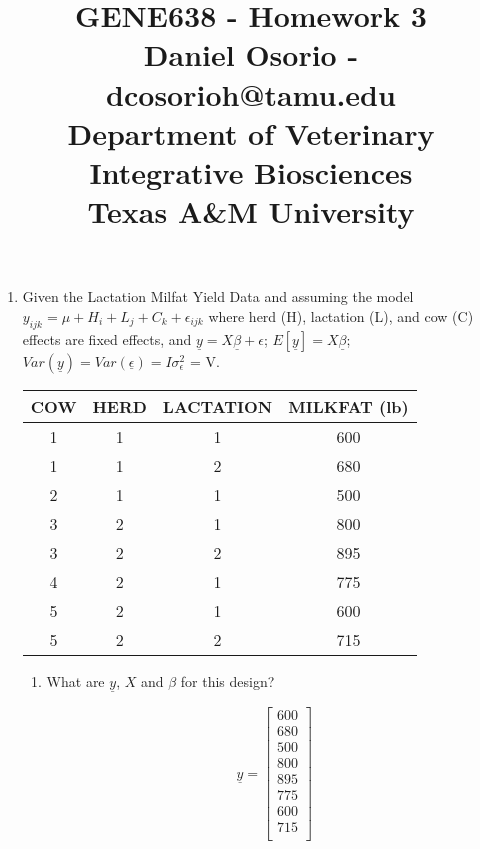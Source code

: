 \documentclass[12pt,a4paper]{paper}
\begin{document}
\title{GENE638 - Homework 3\\\small{Daniel Osorio - dcosorioh@tamu.edu\\Department of Veterinary Integrative Biosciences\\Texas A\&M University}}
\maketitle

\begin{enumerate}
\item Given the Lactation Milfat Yield Data and assuming the model $y_{ijk} = \mu + H_{i} + L_{j}+C_{k} + \epsilon_{ijk}$ where herd (H), lactation (L), and cow (C) effects are fixed effects, and $\underline{y} = X\underline{\beta} + \epsilon$; $E\left[\underline{y}\right] = X\underline{\beta}$; $Var(\underline{y}) = Var(\underline{\epsilon}) = I\sigma^{2}_{\epsilon}$ = V.
\begin{center}
\begin{tabular}{|c|c|c|c|}
\hline
COW & HERD & LACTATION & MILKFAT (lb) \\
\hline
\hline
1 & 1 & 1 & 600 \\
\hline
1 & 1 & 2 & 680 \\
\hline
2 & 1 & 1 & 500 \\
\hline
3 & 2 & 1 & 800 \\
\hline
3 & 2 & 2 & 895 \\
\hline
4 & 2 & 1 & 775 \\
\hline
5 & 2 & 1 & 600 \\
\hline
5 & 2 & 2 & 715 \\
\hline
\end{tabular}
\end{center}
\begin{enumerate}
\item What are $\underline{y}$, $X$ and $\beta$ for this design?\\
\begin{minipage}[c]{0.2\linewidth}
\[\underline{y} = \left[\begin{array}{c}600 \\ 
  680 \\ 
  500 \\ 
  800 \\ 
  895 \\ 
  775 \\ 
  600 \\ 
  715 \\ \end{array}\right]\]

\end{minipage}
\end{enumerate}
\end{enumerate}
\end{document}
